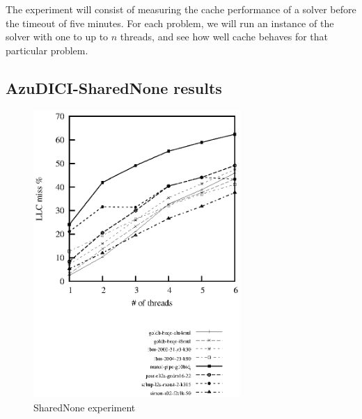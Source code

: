 \documentclass[12pt]{diicc}
\begin{document}
The experiment will consist of measuring the cache performance of a solver before the timeout of five minutes. For each problem, we will run an instance of the solver with one to up to $n$ threads, and see how well cache behaves for that particular problem.

\subsection{AzuDICI-SharedNone results}

\begin{figure}[h!]
	\centering
		\includegraphics[width=0.7\textwidth]{shared-none}
	\caption{SharedNone experiment}
	\label{fig:shared-none}
\end{figure}
\end{document}
